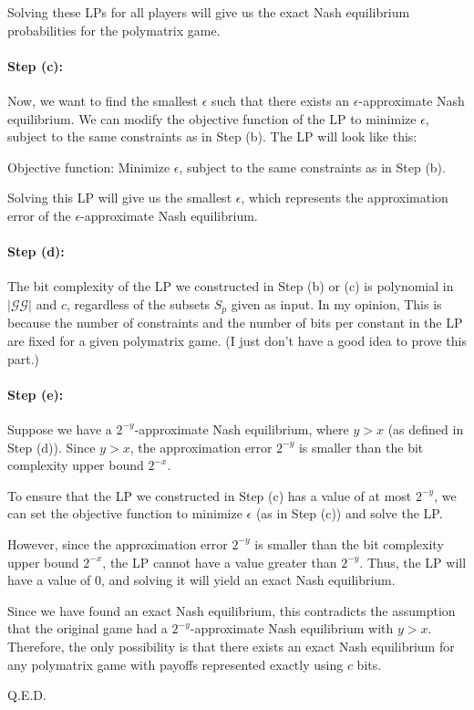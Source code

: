 \documentclass{article}
\begin{document}
Solving these LPs for all players will give us the exact Nash equilibrium probabilities for the polymatrix game.

\paragraph{Step (c):}
Now, we want to find the smallest $\epsilon$ such that there exists an $\epsilon$-approximate Nash equilibrium. We can modify the objective function of the LP to minimize $\epsilon$, subject to the same constraints as in Step (b). The LP will look like this:

Objective function:
Minimize $\epsilon$, subject to the same constraints as in Step (b).

Solving this LP will give us the smallest $\epsilon$, which represents the approximation error of the $\epsilon$-approximate Nash equilibrium.

\paragraph{Step (d):}
The bit complexity of the LP we constructed in Step (b) or (c) is polynomial in $|\mathcal{GG}|$ and $c$, regardless of the subsets $S_p$ given as input. In my opinion, This is because the number of constraints and the number of bits per constant in the LP are fixed for a given polymatrix game. (I just don't have a good idea to prove this part.)

\paragraph{Step (e):}
Suppose we have a $2^{-y}$-approximate Nash equilibrium, where $y > x$ (as defined in Step (d)). Since $y > x$, the approximation error $2^{-y}$ is smaller than the bit complexity upper bound $2^{-x}$.

To ensure that the LP we constructed in Step (c) has a value of at most $2^{-y}$, we can set the objective function to minimize $\epsilon$ (as in Step (c)) and solve the LP.

However, since the approximation error $2^{-y}$ is smaller than the bit complexity upper bound $2^{-x}$, the LP cannot have a value greater than $2^{-y}$. Thus, the LP will have a value of $0$, and solving it will yield an exact Nash equilibrium.

Since we have found an exact Nash equilibrium, this contradicts the assumption that the original game had a $2^{-y}$-approximate Nash equilibrium with $y > x$. Therefore, the only possibility is that there exists an exact Nash equilibrium for any polymatrix game with payoffs represented exactly using $c$ bits.

Q.E.D.


\newpage



\end{document}
